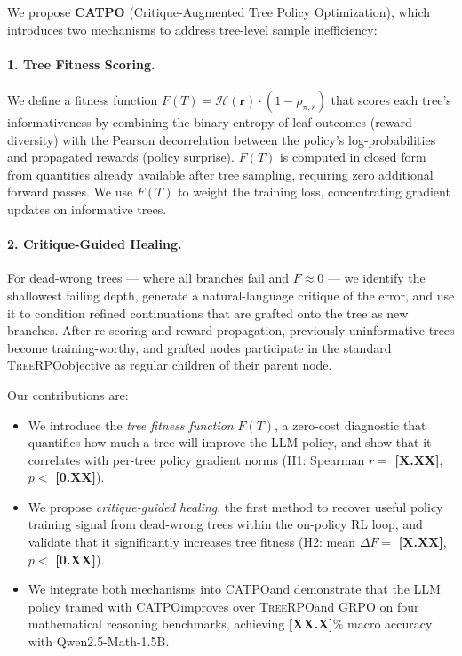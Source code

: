 \documentclass{article} %
\newcommand{\CATPO}{\textsc{CATPO}}
\newcommand{\TreeRPO}{\textsc{TreeRPO}}
\newcommand{\placeholder}[1]{{\color{red}\textbf{[#1]}}}
\begin{document}
We propose \textbf{\CATPO} (Critique-Augmented Tree Policy Optimization), which introduces two mechanisms to address tree-level sample inefficiency:

\paragraph{1. Tree Fitness Scoring.} We define a fitness function $F(T) = \mathcal{H}(\mathbf{r}) \cdot (1 - \rho_{\pi,r})$ that scores each tree's informativeness by combining the binary entropy of leaf outcomes (reward diversity) with the Pearson decorrelation between the policy's log-probabilities and propagated rewards (policy surprise). $F(T)$ is computed in closed form from quantities already available after tree sampling, requiring zero additional forward passes. We use $F(T)$ to weight the training loss, concentrating gradient updates on informative trees.

\paragraph{2. Critique-Guided Healing.} For dead-wrong trees --- where all branches fail and $F \approx 0$ --- we identify the shallowest failing depth, generate a natural-language critique of the error, and use it to condition refined continuations that are grafted onto the tree as new branches. After re-scoring and reward propagation, previously uninformative trees become training-worthy, and grafted nodes participate in the standard \TreeRPO objective as regular children of their parent node.

Our contributions are:
\begin{itemize}
    \item We introduce the \emph{tree fitness function} $F(T)$, a zero-cost diagnostic that quantifies how much a tree will improve the LLM policy, and show that it correlates with per-tree policy gradient norms (H1: Spearman $r =$ \placeholder{X.XX}, $p <$ \placeholder{0.XX}).
    \item We propose \emph{critique-guided healing}, the first method to recover useful policy training signal from dead-wrong trees within the on-policy RL loop, and validate that it significantly increases tree fitness (H2: mean $\Delta F =$ \placeholder{X.XX}, $p <$ \placeholder{0.XX}).
    \item We integrate both mechanisms into \CATPO and demonstrate that the LLM policy trained with \CATPO improves over \TreeRPO and GRPO on four mathematical reasoning benchmarks, achieving \placeholder{XX.X}\% macro accuracy with Qwen2.5-Math-1.5B.
\end{itemize}
\end{document}

